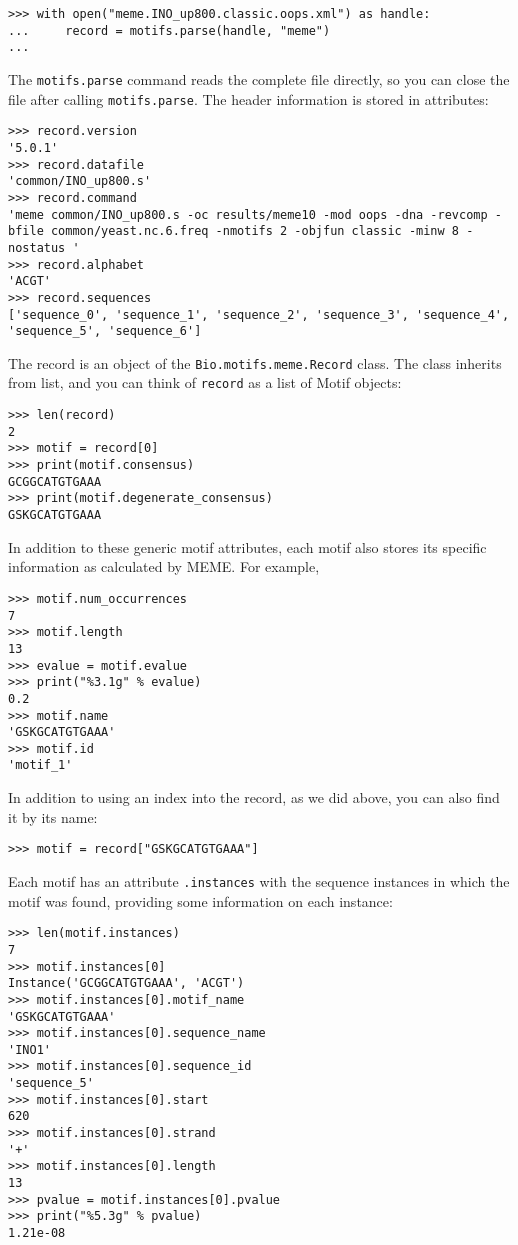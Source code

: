 \begin{verbatim}
>>> with open("meme.INO_up800.classic.oops.xml") as handle:
...     record = motifs.parse(handle, "meme")
...
\end{verbatim}
The \verb+motifs.parse+ command reads the complete file directly, so you can
close the file after calling \verb+motifs.parse+.
The header information is stored in attributes:

\begin{verbatim}
>>> record.version
'5.0.1'
>>> record.datafile
'common/INO_up800.s'
>>> record.command
'meme common/INO_up800.s -oc results/meme10 -mod oops -dna -revcomp -bfile common/yeast.nc.6.freq -nmotifs 2 -objfun classic -minw 8 -nostatus '
>>> record.alphabet
'ACGT'
>>> record.sequences
['sequence_0', 'sequence_1', 'sequence_2', 'sequence_3', 'sequence_4', 'sequence_5', 'sequence_6']
\end{verbatim}
The record is an object of the \verb+Bio.motifs.meme.Record+ class.
The class inherits from list, and you can think of \verb+record+ as a list of Motif objects:

\begin{verbatim}
>>> len(record)
2
>>> motif = record[0]
>>> print(motif.consensus)
GCGGCATGTGAAA
>>> print(motif.degenerate_consensus)
GSKGCATGTGAAA
\end{verbatim}
In addition to these generic motif attributes, each motif also stores its
specific information as calculated by MEME. For example,

\begin{verbatim}
>>> motif.num_occurrences
7
>>> motif.length
13
>>> evalue = motif.evalue
>>> print("%3.1g" % evalue)
0.2
>>> motif.name
'GSKGCATGTGAAA'
>>> motif.id
'motif_1'
\end{verbatim}
In addition to using an index into the record, as we did above,
you can also find it by its name:

\begin{verbatim}
>>> motif = record["GSKGCATGTGAAA"]
\end{verbatim}
Each motif has an attribute \verb+.instances+ with the sequence instances
in which the motif was found, providing some information on each instance:

\begin{verbatim}
>>> len(motif.instances)
7
>>> motif.instances[0]
Instance('GCGGCATGTGAAA', 'ACGT')
>>> motif.instances[0].motif_name
'GSKGCATGTGAAA'
>>> motif.instances[0].sequence_name
'INO1'
>>> motif.instances[0].sequence_id
'sequence_5'
>>> motif.instances[0].start
620
>>> motif.instances[0].strand
'+'
>>> motif.instances[0].length
13
>>> pvalue = motif.instances[0].pvalue
>>> print("%5.3g" % pvalue)
1.21e-08
\end{verbatim}


